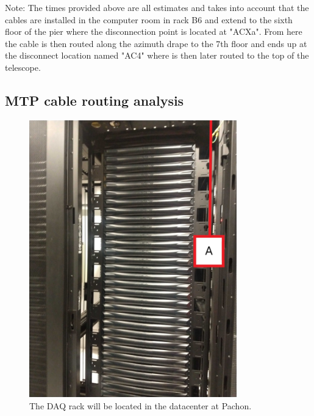 Note: The times provided above are all estimates and takes into account that the cables are installed in the computer room in rack B6 and extend to the sixth floor of the pier where the disconnection point is located at "ACXa". From here the cable is then routed along the azimuth drape to the 7th floor and ends up at the disconnect location named "AC4" where is then later routed to the top of the telescope.

\newpage

  \subsection{MTP cable routing analysis}
  \begin{figure}
    \centering
    \includegraphics[width=9cm]{images/111.jpg}
    \caption*{The DAQ rack will be located in the datacenter at Pachon.} 
  \end{figure}

\newpage

